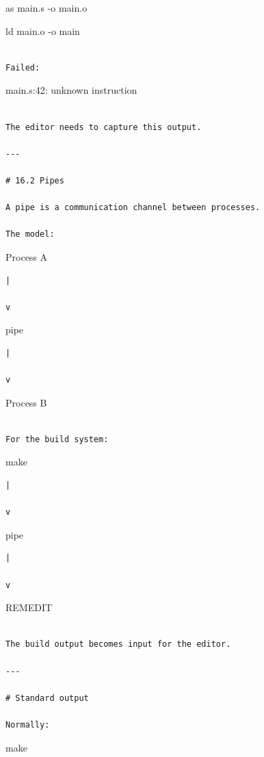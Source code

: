 \documentclass[
  oneside,
  openany]{book}
\begin{document}
as main.s -o main.o

ld main.o -o main

\begin{verbatim}

Failed:
\end{verbatim}

main.s:42: unknown instruction

\begin{verbatim}

The editor needs to capture this output.

---

# 16.2 Pipes

A pipe is a communication channel between processes.

The model:
\end{verbatim}

Process A

\begin{verbatim}
|

v
\end{verbatim}

pipe

\begin{verbatim}
|

v
\end{verbatim}

Process B

\begin{verbatim}

For the build system:
\end{verbatim}

make

\begin{verbatim}
|

v
\end{verbatim}

pipe

\begin{verbatim}
|

v
\end{verbatim}

REMEDIT

\begin{verbatim}

The build output becomes input for the editor.

---

# Standard output

Normally:
\end{verbatim}

make
\end{document}
